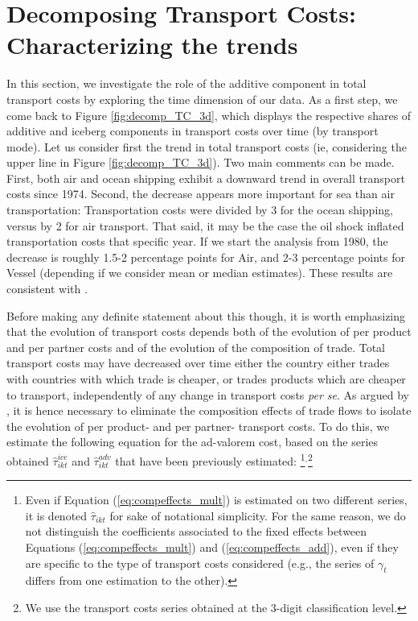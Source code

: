 \documentclass[a4paper,11pt]{article}
\begin{document}
\smallskip


\section{Decomposing Transport Costs: Characterizing the trends \label{sec:results_trends}}

In this section, we investigate the role of the additive component in total transport costs by exploring the time dimension of our data. As a first step, we come back to Figure \ref{fig:decomp_TC_3d}, which displays the respective shares of additive and iceberg components in transport costs over time (by transport mode).
Let us consider first the trend in total transport costs (ie, considering the upper line in Figure \ref{fig:decomp_TC_3d}). Two main comments can be made. First, both air and ocean shipping exhibit a downward trend in overall transport costs since 1974. Second, the decrease appears more important for sea than air transportation: Transportation costs were divided by 3 for the ocean shipping, versus by 2 for air transport. That said, it may be the case the oil shock inflated transportation costs that specific year. If we start the analysis from 1980, the decrease is roughly 1.5-2 percentage points for Air, and 2-3 percentage points for Vessel (depending if we consider mean or median estimates). These results are consistent with \citet{hummels2007}.

Before making any definite statement about this though, it is worth emphasizing that the evolution of transport costs depends both of the evolution of per product and per partner costs and of the evolution of the composition of trade.
Total transport costs may have decreased over time either the country either trades with countries with which trade is cheaper, or trades products which are cheaper to transport, independently of any change in transport costs \textit{per se}. As argued by \citet{hummels2007}, it is hence necessary to eliminate the composition effects of trade flows to isolate the evolution of per product- and per partner- transport costs. To do this, we estimate the following equation for the ad-valorem cost, based on the series obtained $\widehat{\tau}_{ikt}^{ice}$ and $\widehat{\tau}_{ikt}^{adv}$ that have been previously estimated:
\footnote{Even if Equation (\ref{eq:compeffects_mult}) is estimated on two different series, it is denoted $\widehat{\tau}_{ikt}$ for sake of notational simplicity. For the same reason, we do not distinguish the coefficients associated to the fixed effects between Equations (\ref{eq:compeffects_mult}) and (\ref{eq:compeffects_add}), even if they are specific to the type of transport costs considered (e.g., the series of $\gamma_t$ differs from one estimation to the other).}$^{,}$\footnote{We use the transport costs series obtained at the 3-digit classification level.}
\end{document}
